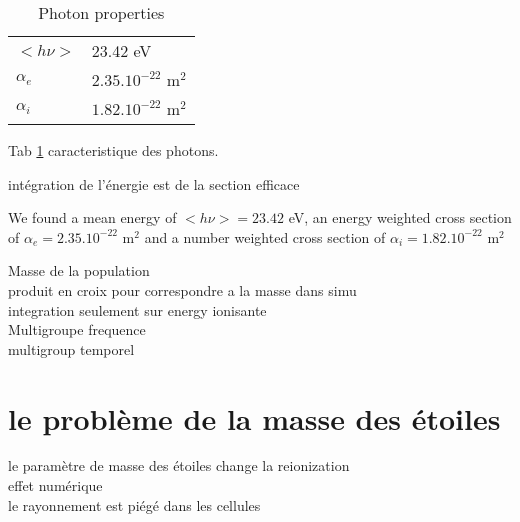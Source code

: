 \begin{table}
\begin{tabular}{|l|l|}
  \hline
	$<h\nu>$	&  23.42 eV \\
	$\alpha_e$	&  $2.35.10^{-22}$ m$^2$ \\
	$\alpha_i$	&  $1.82.10^{-22}$ m$^2$ \\
  \hline
\end{tabular}
\caption{Photon properties
\label{tab_photon}}
\end{table}

Tab \ref{tab_photon} caracteristique des photons.


intégration de l'énergie est de la section efficace


We found a mean energy of $<h\nu> = 23.42$ eV,
an energy weighted cross section of
$\alpha_e = 2.35.10^{-22}$ m$^2$
and a number weighted cross section of
$\alpha_i = 1.82.10^{-22}$ m$^2$



Masse de la population\\
produit en croix pour correspondre a la masse dans simu\\
integration seulement sur energy ionisante\\

Multigroupe frequence\\
multigroup temporel\\


\section{le problème de la masse des étoiles}

le paramètre de masse des étoiles change la reionization\\
effet numérique\\
le rayonnement est piégé dans les cellules\\






